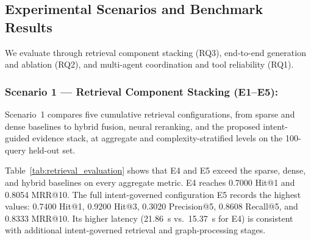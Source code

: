 \subsection{Experimental Scenarios and Benchmark Results}
\label{sec:scenarios}

We evaluate \system{} through retrieval component stacking (RQ3), end-to-end generation and ablation (RQ2), and multi-agent coordination and tool reliability (RQ1).

\subsubsection{Scenario 1 --- Retrieval Component Stacking (E1--E5):}
Scenario~1 compares five cumulative retrieval configurations, from sparse and dense baselines to hybrid fusion, neural reranking, and the proposed intent-guided evidence stack, at aggregate and complexity-stratified levels on the 100-query held-out set.

Table~\ref{tab:retrieval_evaluation} shows that E4 and E5 exceed the sparse, dense, and hybrid baselines on every aggregate metric. E4 reaches 0.7000 Hit@1 and 0.8054 MRR@10. The full intent-governed configuration E5 records the highest values: 0.7400 Hit@1, 0.9200 Hit@3, 0.3020 Precision@5, 0.8608 Recall@5, and 0.8333 MRR@10. Its higher latency (21.86~s vs.\ 15.37~s for E4) is consistent with additional intent-governed retrieval and graph-processing stages.

\begin{table}[!htbp]
\centering
\caption{Scenario 1: Progressive retrieval component stacking on the redesigned Held-Out Test Set ($N=100$).}
\label{tab:retrieval_evaluation}
\end{table}

